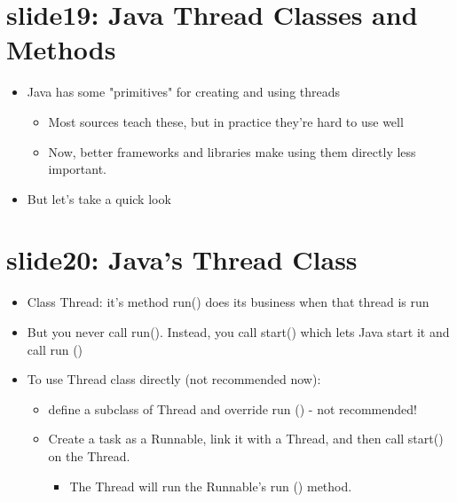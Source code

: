 \documentclass[12pt, a4paper]{book}
\begin{document}
\section{slide19: Java Thread Classes and Methods}
\begin{itemize}
    \item Java has some "primitives" for creating and using threads
          \begin{itemize}
              \item Most sources teach these, but in practice they're hard to use well
              \item Now, better frameworks and libraries make using them directly less important.
          \end{itemize}
    \item But let's take a quick look
\end{itemize}

\section{slide20: Java's Thread Class}
\begin{itemize}
    \item  Class Thread: it's method run() does its business when that thread is run
    \item But you never call run(). Instead, you call start() which lets Java start it and call run ()
    \item To use Thread class directly (not recommended now):
          \begin{itemize}
              \item define a subclass of Thread and override run () - not recommended!
              \item Create a task as a Runnable, link it with a Thread, and then call start() on the Thread.
                    \begin{itemize}
                        \item The Thread will run the Runnable's run () method.
                    \end{itemize}
          \end{itemize}
\end{itemize}
\end{document}
